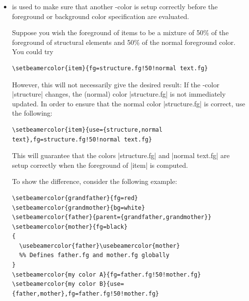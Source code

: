 \begin{command}{\setbeamercolor\opt{|*|}}
\begin{itemize}
    \example
\begin{verbatim}
\setbeamercolor{father}{fg=red}
\setbeamercolor{mother}{bg=green}
\setbeamercolor{child}{parent={father,mother}}
\begin{beamercolorbox}{child}
  Terrible red on green text.
\end{beamercolorbox}

\setbeamercolor{father}{fg=blue}
\begin{beamercolorbox}{child}
  Now terrible blue on green text, since parent was changed.
\end{beamercolorbox}
\end{verbatim}

    Note that a change of the foreground or background of a parent changes the corresponding foreground or background of the child (unless it is overruled).

    A \beamer-color can not only have parents, but also grandparents and so on.
  \item
     is used to make sure that another \beamer-color is setup correctly before the foreground or background color specification are evaluated.

    Suppose you wish the foreground of items to be a mixture of 50\% of the foreground of structural elements and 50\% of the normal foreground color. You could try

\begin{verbatim}
\setbeamercolor{item}{fg=structure.fg!50!normal text.fg}
\end{verbatim}

    However, this will not necessarily give the desired result: If the \beamer-color |structure| changes, the (normal) color |structure.fg| is not immediately updated. In order to ensure that the normal color |structure.fg| is correct, use the following:

\begin{verbatim}
\setbeamercolor{item}{use={structure,normal text},fg=structure.fg!50!normal text.fg}
\end{verbatim}

    This will guarantee that the colors |structure.fg| and |normal text.fg| are setup correctly when the foreground of |item| is computed.

    To show the difference, consider the following example:

\begin{verbatim}
\setbeamercolor{grandfather}{fg=red}
\setbeamercolor{grandmother}{bg=white}
\setbeamercolor{father}{parent={grandfather,grandmother}}
\setbeamercolor{mother}{fg=black}
{
  \usebeamercolor{father}\usebeamercolor{mother}
  %% Defines father.fg and mother.fg globally
}
\setbeamercolor{my color A}{fg=father.fg!50!mother.fg}
\setbeamercolor{my color B}{use={father,mother},fg=father.fg!50!mother.fg}


\end{verbatim}
\end{itemize}
\end{command}
